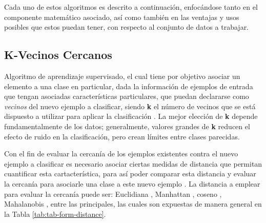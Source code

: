 Cada uno de estos algoritmos es descrito a continuación, enfocándose tanto en el componente matemático asociado, así como también en las ventajas y usos posibles que estos puedan tener, con respecto al conjunto de datos a trabajar.

\subsection{K-Vecinos Cercanos}

Algoritmo de aprendizaje supervisado, el cual tiene por objetivo asociar un elemento a una clase en particular, dada la información de ejemplos de entrada que tengan asociadas características particulares, que puedan declararse como \textit{vecinos} del nuevo ejemplo a clasificar, siendo \textbf{k} el número de vecinos que se está dispuesto a utilizar para aplicar la clasificación \cite{6313426}. La mejor elección de \textbf{k} depende fundamentalmente de los datos; generalmente, valores grandes de \textbf{k} reducen el efecto de ruido en la clasificación, pero crean límites entre clases parecidas.

Con el fin de evaluar la cercanía de los ejemplos existentes contra el nuevo ejemplo a clasificar es necesario asociar ciertas medidas de distancia que permitan cuantificar esta cartacterística, para así poder comparar esta distancia y evaluar la cercanía para asociarle una clase a este nuevo ejemplo \cite{5408784}. La distancia a emplear para evaluar la cercanía puede ser: Euclidiana \cite{DANIELSSON1980227}, Manhattan \cite{PERLIBAKAS2004711}, coseno \cite{LIAO20155328}, Mahalanobis \cite{DEMAESSCHALCK20001}, entre las principales, las cuales son expuestas de manera general en la Tabla \ref{tab:tab-form-distance}.

